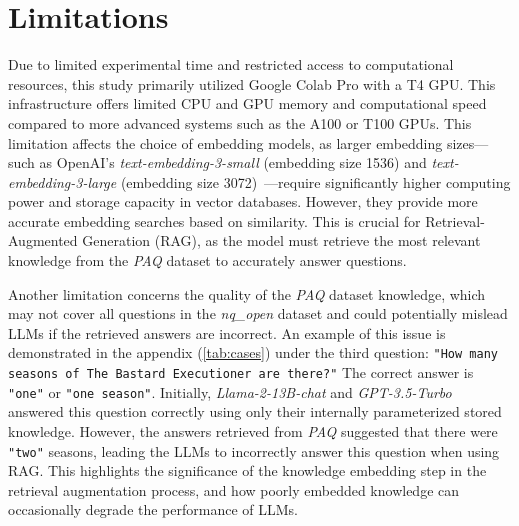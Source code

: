 \section{Limitations}

Due to limited experimental time and restricted access to computational resources, this study primarily utilized Google Colab Pro with a T4 GPU. This infrastructure offers limited CPU and GPU memory and computational speed compared to more advanced systems such as the A100 or T100 GPUs. This limitation affects the choice of embedding models, as larger embedding sizes—such as OpenAI's \emph{text-embedding-3-small} (embedding size 1536) and \emph{text-embedding-3-large} (embedding size 3072)~\citep{openaiembeddings}—require significantly higher computing power and storage capacity in vector databases. However, they provide more accurate embedding searches based on similarity. This is crucial for Retrieval-Augmented Generation (RAG), as the model must retrieve the most relevant knowledge from the \emph{PAQ} dataset to accurately answer questions.

Another limitation concerns the quality of the \emph{PAQ} dataset knowledge, which may not cover all questions in the \emph{nq\_open} dataset and could potentially mislead LLMs if the retrieved answers are incorrect. An example of this issue is demonstrated in the appendix (\cref{tab:cases}) under the third question: \texttt{"How many seasons of The Bastard Executioner are there?"} The correct answer is \texttt{"one"} or \texttt{"one season"}. Initially, \emph{Llama-2-13B-chat} and \emph{GPT-3.5-Turbo} answered this question correctly using only their internally parameterized stored knowledge. However, the answers retrieved from \emph{PAQ} suggested that there were \texttt{"two"} seasons, leading the LLMs to incorrectly answer this question when using RAG. This highlights the significance of the knowledge embedding step in the retrieval augmentation process, and how poorly embedded knowledge can occasionally degrade the performance of LLMs.
